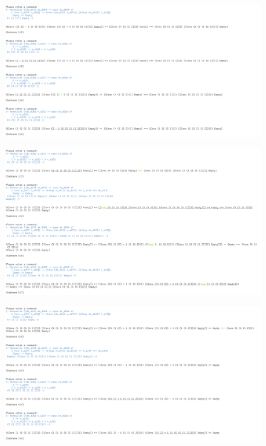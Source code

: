 \begin{figure}
    \includegraphics[width=1\textwidth]{resources/applicative_part_4.PNG}
\end{figure}
\begin{figure}
    \includegraphics[width=1\textwidth]{resources/applicative_part_5.PNG}
\end{figure}
\begin{figure}
    \includegraphics[width=1\textwidth]{resources/applicative_part_6.PNG}
\end{figure}
